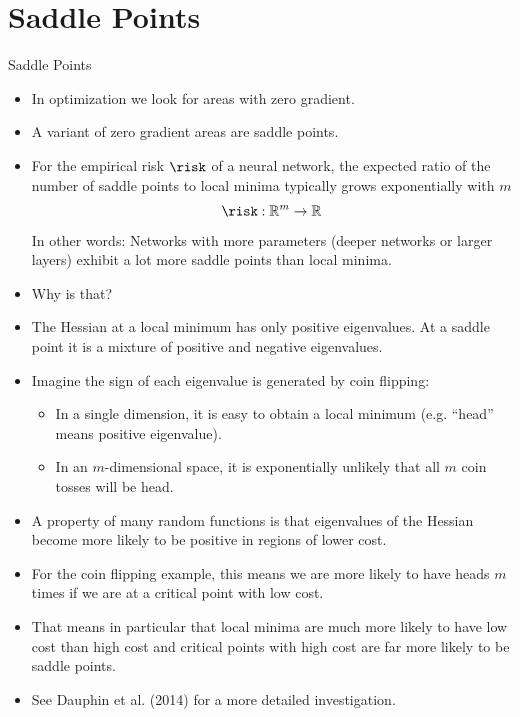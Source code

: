 \section{Saddle Points}
\begin{vbframe}{Saddle Points}
  \begin{itemize}
    \item In optimization we look for areas with zero gradient.
    \item A variant of zero gradient areas are saddle points.
    \item For the empirical risk $\risk$ of a neural network, the expected ratio of the number of saddle points to local minima typically grows exponentially with $m$ 
    $$\risk: \mathbb{R}^m \rightarrow \mathbb{R}$$ 
    In other words: Networks with more parameters (deeper networks or larger layers) exhibit a lot more saddle points than local minima.
     \item Why is that?
    \item The Hessian at a local minimum has only positive eigenvalues. At a saddle point it is a mixture of positive and negative eigenvalues.
    
\framebreak
    
    \item Imagine the sign of each eigenvalue is generated by coin flipping:
    \begin{itemize}
      \item In a single dimension, it is easy to obtain a local minimum (e.g. \enquote{head} means positive eigenvalue).
      \item In an $m$-dimensional space, it is exponentially unlikely that all $m$ coin tosses will be head.
    \end{itemize}
    \item A property of many random functions is that eigenvalues of the Hessian become more likely to be positive in regions of lower cost.
    \item For the coin flipping example, this means we are more likely to have heads $m$ times if we are at a critical point with low cost.
    \item That means in particular that local minima are much more likely to have low cost than high cost and critical points with high cost are far more likely to be saddle points.
    \item See Dauphin et al. (2014) for a more detailed investigation.
    
\framebreak
    

\end{itemize}
\end{vbframe}
